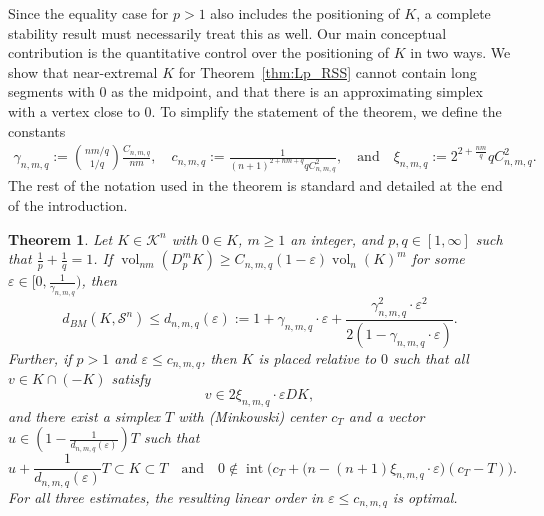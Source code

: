 \documentclass{amsart}
\newtheorem{theorem}{Theorem}[section]
\newcommand\CK{\mathcal{K}}
\DeclareMathOperator{\inte}{int}
\DeclareMathOperator{\vol}{vol}
\newcommand{\diff}[3]{D_{#1}^{#2} #3}
\newcommand{\simplex}[1]{\mathcal{S}^{#1}}
\begin{document}
Since the equality case for $p > 1$ also includes the positioning of $K$, a complete stability result must necessarily treat this as well.
Our main conceptual contribution is the quantitative control over the positioning of $K$ in two ways.
We show that near-extremal $K$ for Theorem~\ref{thm:Lp_RSS} cannot contain long segments with $0$ as the midpoint,
and that there is an approximating simplex with a vertex close to $0$.
To simplify the statement of the theorem, we define the constants
\begin{align*}
    \gamma_{n,m,q} := \binom{nm/q}{1/q} \frac{C_{n,m,q}}{nm},
        \quad
    c_{n,m,q} := \frac{1}{(n+1)^{2+nm+q} q C_{n,m,q}^2},
        \quad \text{and} \quad
    \xi_{n,m,q} := 2^{2 + \frac{nm}{q}} q C_{n,m,q}^2.
\end{align*}
The rest of the notation used in the theorem is standard and detailed at the end of the introduction.



\begin{theorem}\label{thm:Lp_RSS_stability}
Let $K \in \CK^n$ with $0 \in K$, $m \geq 1$ an integer, and $p,q \in [1,\infty]$
such that
$\frac{1}{p} + \frac{1}{q} = 1$.
If $\vol_{nm}(\diff{p}{m}{K}) \geq C_{n,m,q} (1 - \varepsilon) \vol_n(K)^m$ for some $\varepsilon \in [0,\frac{1}{\gamma_{n,m,q}})$, then
\[
    d_{BM}(K,\simplex{n})
    \leq d_{n,m,q}(\varepsilon)
    := 1 + \gamma_{n,m,q} \cdot \varepsilon + \frac{\gamma_{n,m,q}^2 \cdot \varepsilon^2}{2 (1 - \gamma_{n,m,q} \cdot \varepsilon)}.
\]
Further, if $p > 1$ and $\varepsilon \leq c_{n,m,q}$, then $K$ is placed relative to $0$ such that all $v \in K \cap (-K)$
satisfy
\[
    v
    \in 2 \xi_{n,m,q} \cdot \varepsilon DK,
\]
and there exist a simplex $T$ with (Minkowski) center $c_T$ and a vector $u \in (1-\frac{1}{d_{n,m,q}(\varepsilon)}) T$ such that
\[
    u + \frac{1}{d_{n,m,q}(\varepsilon)} T
    \subset K
    \subset T
        \quad \text{and} \quad
    0 \notin \inte \bigg( c_T + \Big( n - (n+1) \xi_{n,m,q} \cdot \varepsilon \Big) (c_T - T) \bigg).
\]
For all three estimates, the resulting linear order in $\varepsilon \leq c_{n,m,q}$ is optimal.
\end{theorem}
\end{document}

